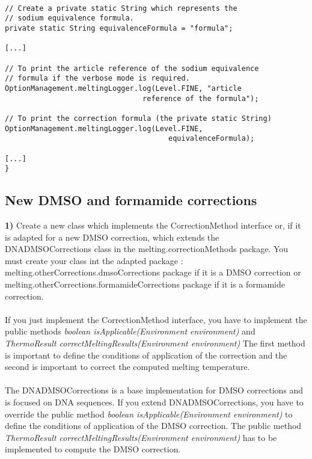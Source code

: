 \documentclass{article}
\begin{document}
\begin{verbatim}

// Create a private static String which represents the 
// sodium equivalence formula.
private static String equivalenceFormula = "formula";

[...]

// To print the article reference of the sodium equivalence 
// formula if the verbose mode is required.
OptionManagement.meltingLogger.log(Level.FINE, "article 
                                reference of the formula");

// To print the correction formula (the private static String)
OptionManagement.meltingLogger.log(Level.FINE, 
                                      equivalenceFormula);

[...]
}

\end{verbatim}

\subsection{New DMSO and formamide corrections}

\textbf{1)} Create a new class which implements the CorrectionMethod interface or, if it is adapted for
a new DMSO correction, which extends the DNADMSOCorrections class in the melting.correctionMethods package.
You must create your class int the adapted package : melting.otherCorrections.dmsoCorrections 
package if it is a DMSO correction or melting.otherCorrections.formamideCorrections package if
it is a formamide correction.\\
\\
If you just implement the CorrectionMethod interface, you have to implement the public methods 
\textit{boolean isApplicable(Environment environment)} and \textit{ThermoResult correctMeltingResults(Environment environment)}
The first method is important to define the conditions of application of the correction and the 
second is important to correct the computed melting temperature.\\
\\
The DNADMSOCorrections is a base implementation for DMSO corrections and is focused on DNA sequences.
If you extend DNADMSOCorrections, you have to override the public method \textit{boolean isApplicable(Environment environment)} 
to define the conditions of application of the DMSO correction.
The public method \textit{ThermoResult correctMeltingResults(Environment environment)} 
has to be implemented to compute the DMSO correction.\\
\\
\end{document}
